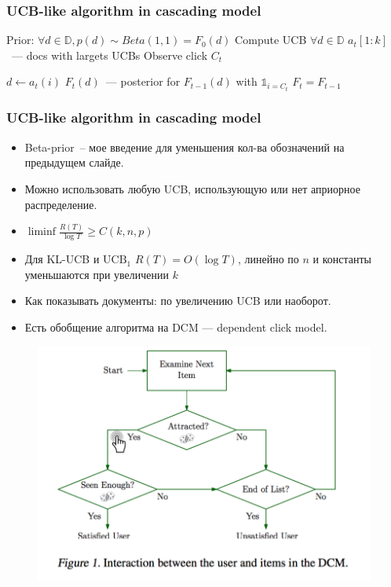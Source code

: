\documentclass[xetex,mathserif,serif,table]{beamer}
\begin{document}
\begin{frame}
\frametitle{UCB-like algorithm in cascading model}

\begin{algorithmic}
 \State Prior: $\forall d \in \mathbb{D}, p(d) \sim Beta(1, 1) = F_0(d)$
    \State Compute UCB $\forall d \in \mathbb{D}$
    \State $a_t[1:k]$ — docs with largets UCBs
    \State Observe click $C_t$ 

      \State $d \gets a_t(i)$
      \State $F_{t}(d)$ — posterior for $F_{t-1}(d)$ with $\mathbb{1}_{i = C_t}$
    \EndFor
      \State $F_{t} = F_{t-1}$
    \EndFor
  \EndFor 
\end{algorithmic}
\end{frame}
\begin{frame}
\frametitle{UCB-like algorithm in cascading model}
\begin{itemize}
\item Beta-prior -- мое введение для уменьшения кол-ва обозначений на предыдущем слайде.
\item Можно использовать любую UCB, использующую или нет априорное распределение. 
\item $\liminf \frac{R(T)}{\log T} \geq C(k, n, p) $
\item Для KL-UCB и $\mathrm{UCB}_1$ $R(T) = O(\log T)$, линейно по $n$ и константы уменьшаются при увеличении $k$
\item Как показывать документы: по увеличению UCB или наоборот. 
\item Есть обобщение алгоритма на DCM — dependent click model.
\end{itemize}
\end{frame}

\begin{frame}

\begin{figure}
  \centering
     \includegraphics[width=0.7\paperwidth]{img/dcm.png}
\end{figure}
\end{frame}
\end{document}
